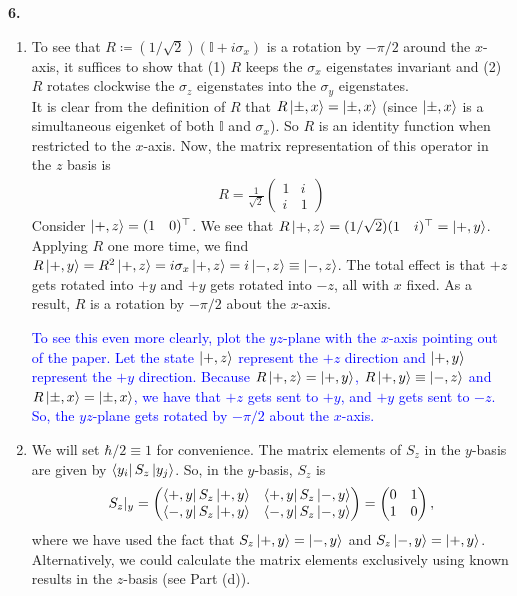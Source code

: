 \documentclass{article}
\theoremstyle{definition}
\newcommand{\f}[2]{\frac{#1}{#2}}
\begin{document}
\noindent \textbf{6.}
\begin{enumerate}[label=(\alph*)]
	\item To see that $R \coloneqq (1/\sqrt{2})(\mathbb{I} + i\sigma_x)$ is a rotation by $-\pi/2$ around the $x$-axis, it suffices to show that (1) $R$ keeps the $\sigma_x$ eigenstates invariant and (2) $R$ rotates clockwise the $\sigma_z$ eigenstates into the $\sigma_y$ eigenstates. \\
	
	It is clear from the definition of  $R$ that $R\ket{\pm ,x} = \ket{\pm,x}$ (since $\ket{\pm, x}$ is a simultaneous eigenket of both $\mathbb{I}$ and $\sigma_x$). So $R$ is an identity function when restricted to the $x$-axis. Now, the matrix representation of this operator in the $z$ basis is 
	\begin{align*}
	R = \f{1}{\sqrt{2}} \begin{pmatrix}
	1 & i \\ i & 1
	\end{pmatrix}
	\end{align*}
	Consider $\ket{+,z} = (1\quad0)^\top$. We see that $R \ket{+,z} =  (1/\sqrt{2})(1 \quad i)^\top = \ket{+,y}$. Applying $R$ one more time, we find $R \ket{+ ,y} =  R^2 \ket{+,z} = i\sigma_x \ket{+,z} = i\ket{-,z} \equiv \ket{-,z}$. The total effect is that $+z$ gets rotated into $+y$ and $+y$ gets rotated into $-z$, all with $x$ fixed. As a result, $R$ is a rotation by $-\pi/2$ about the $x$-axis.  
	
	\textcolor{blue}{To see this even more clearly, plot the $yz$-plane with the $x$-axis pointing out of the paper. Let the state $\ket{+,z}$ represent the $+z$ direction and $\ket{+,y}$ represent the $+y$ direction. Because $R\ket{+,z} = \ket{+,y}$, $R\ket{+,y} \equiv \ket{-,z}$ and $R\ket{\pm ,x} = \ket{\pm,x}$, we have  that $+z$ gets sent to $+y$, and $+y$ gets sent to $-z$. So, the $yz$-plane gets rotated by $-\pi/2$ about the $x$-axis. }
	
	\item We will set $\hbar/2 \equiv 1$ for convenience. The matrix elements of $S_z$ in the $y$-basis are given by $\bra{y_i} S_z \ket{y_j}$. So, in the $y$-basis, $S_z$ is 
	\begin{align*}
	S_z\vert_y = \begin{pmatrix}
	\bra{+,y} S_z \ket{+,y} & \bra{+,y} S_z \ket{-,y} \\
	\bra{-,y} S_z \ket{+,y} & \bra{-,y} S_z \ket{-,y}
	\end{pmatrix} 
	= \begin{pmatrix}
	0 & 1\\ 1 & 0
	\end{pmatrix},
	\end{align*}
	where we have used the fact that $S_z \ket{+,y} = \ket{-,y}$ and $S_z\ket{-,y} = \ket{+,y}$. Alternatively, we could calculate the matrix elements exclusively using known results in the $z$-basis (see Part (d)). 
	
\end{enumerate}
\end{document}
